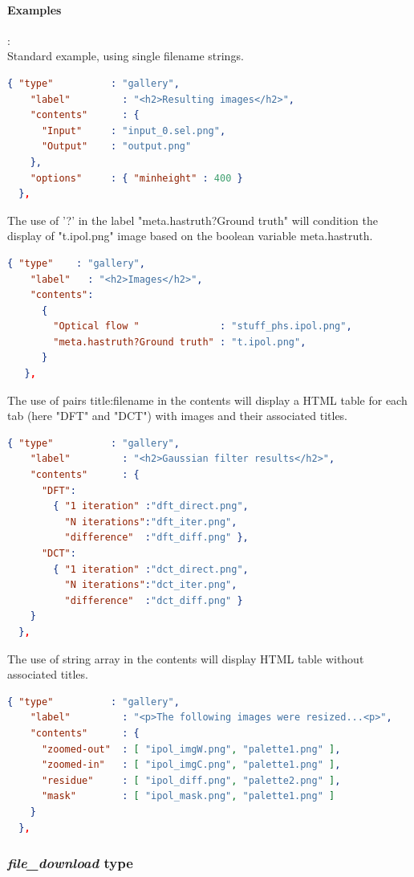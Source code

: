 \paragraph{Examples}:\\
Standard example, using single filename strings.
\begin{lstlisting}[language=json,firstnumber=1]
  { "type"          : "gallery",
    "label"         : "<h2>Resulting images</h2>",
    "contents"      : { 
      "Input"     : "input_0.sel.png", 
      "Output"    : "output.png"
    },
    "options"     : { "minheight" : 400 }
  },
\end{lstlisting}
The use of '?' in the label "meta.hastruth?Ground truth" will condition the 
display of "t.ipol.png" image based on the boolean variable meta.hastruth.
\begin{lstlisting}[language=json,firstnumber=1]
  { "type"    : "gallery",
    "label"   : "<h2>Images</h2>",
    "contents": 
      {
        "Optical flow "              : "stuff_phs.ipol.png", 
        "meta.hastruth?Ground truth" : "t.ipol.png",
      }
   },
\end{lstlisting}
The use of pairs title:filename in the contents will display a HTML table
for each tab (here "DFT" and "DCT") with images and their associated titles.
\begin{lstlisting}[language=json,firstnumber=1]
  { "type"          : "gallery",
    "label"         : "<h2>Gaussian filter results</h2>",
    "contents"      : { 
      "DFT":
        { "1 iteration" :"dft_direct.png", 
          "N iterations":"dft_iter.png", 
          "difference"  :"dft_diff.png" }, 
      "DCT":                     
        { "1 iteration" :"dct_direct.png", 
          "N iterations":"dct_iter.png",
          "difference"  :"dct_diff.png" }
    }
  },
\end{lstlisting}
The use of string array in the contents will display HTML table without associated
titles.
\begin{lstlisting}[language=json,firstnumber=1]
  { "type"          : "gallery",
    "label"         : "<p>The following images were resized...<p>",
    "contents"      : { 
      "zoomed-out"  : [ "ipol_imgW.png", "palette1.png" ],
      "zoomed-in"   : [ "ipol_imgC.png", "palette1.png" ],
      "residue"     : [ "ipol_diff.png", "palette2.png" ],
      "mask"        : [ "ipol_mask.png", "palette1.png" ]
    }
  },
\end{lstlisting}


\subsubsection{ \emph{file\_download} type}

